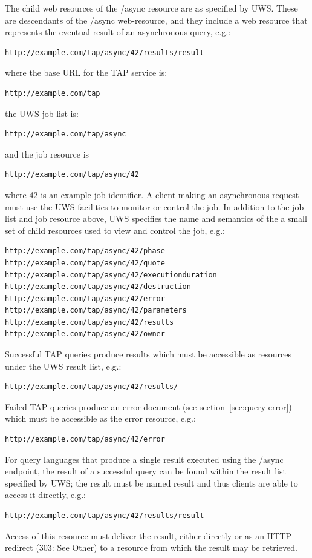 \documentclass[11pt,letter]{ivoa}
\begin{document}
The child web resources of the /async resource are as specified by UWS. These 
are descendants of the /async web-resource, and they include a web resource that 
represents the eventual result of an asynchronous query, e.g.:
\begin{verbatim}
http://example.com/tap/async/42/results/result
\end{verbatim}
where the base URL for the TAP service is:
\begin{verbatim}
http://example.com/tap
\end{verbatim}
the UWS job list is:
\begin{verbatim}
http://example.com/tap/async
\end{verbatim}
and the job resource is
\begin{verbatim}
http://example.com/tap/async/42
\end{verbatim}
where 42 is an example job identifier. A client making an asynchronous request 
must use 
the UWS facilities to monitor or control the job. In addition to the job list 
and job resource above, UWS specifies the name and semantics of the a small set 
of child resources used to view and control the job, e.g.:
\begin{verbatim}
http://example.com/tap/async/42/phase
http://example.com/tap/async/42/quote
http://example.com/tap/async/42/executionduration
http://example.com/tap/async/42/destruction
http://example.com/tap/async/42/error
http://example.com/tap/async/42/parameters
http://example.com/tap/async/42/results
http://example.com/tap/async/42/owner
\end{verbatim}
Successful TAP queries produce results which must be accessible as  resources 
under the UWS result list, e.g.:
\begin{verbatim}
http://example.com/tap/async/42/results/
\end{verbatim}
Failed TAP queries produce an error document (see section~\ref{sec:query-error}) which must be accessible 
as the error resource, e.g.:
\begin{verbatim}
http://example.com/tap/async/42/error
\end{verbatim}
For query languages that produce a single result executed using the /async 
endpoint, the result of a successful query can be found within the result list 
specified by UWS; the result must be named result and thus 
clients are able to access it directly, e.g.:
\begin{verbatim}
http://example.com/tap/async/42/results/result
\end{verbatim}
Access of this resource must deliver the result, either directly or as an HTTP 
redirect (303: See Other) to a resource from which the result may be retrieved.
\end{document}
